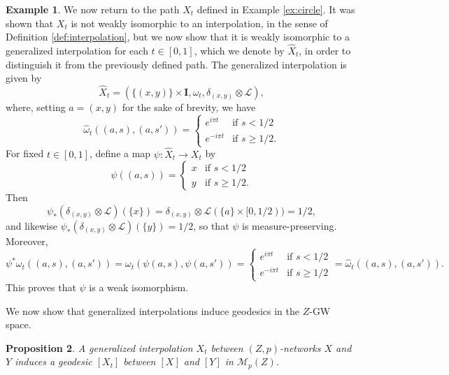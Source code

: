 \documentclass{article}
\newtheorem{proposition}{Proposition}[section]
\theoremstyle{definition}
\newtheorem{example}[proposition]{Example}
\newcommand{\M}{\mathcal{M}}
\newcommand{\MZp}{\M_p(Z)}
\begin{document}
 \begin{example}
        We now return to the path $X_t$ defined in Example \ref{ex:circle}. It was shown that $X_t$ is not weakly isomorphic to an interpolation, in the sense of Definition \ref{def:interpolation}, but we now show that it is weakly isomorphic to a generalized interpolation for each $t \in [0,1]$, which we denote by $\widehat{X}_t$, in order to distinguish it from the previously defined path. The generalized interpolation is given by
        \[
        \widehat{X}_t = \left(\{(x,y)\} \times \mathbf{I}, \widehat{\omega}_t, \delta_{(x,y)} \otimes \mathscr{L}\right),
        \]
        where, setting $a = (x,y)$ for the sake of brevity, we have 
        \[
        \widehat{\omega}_t((a,s),(a,s')) = \left\{\begin{array}{rl}
        e^{i\pi t} &\mbox{if $s < 1/2$} \\
        e^{-i\pi t} &\mbox{if $s \geq 1/2$}.
        \end{array}\right.
        \]
        For fixed $t \in [0,1]$, define a map $\psi:\widehat{X}_t \to X_t$
        by 
        \[
        \psi((a,s)) = \left\{
        \begin{array}{rl}
        x & \mbox{if $s < 1/2$} \\
        y & \mbox{if $s \geq 1/2$.}
        \end{array}\right.
        \]
        Then 
        \[
        \psi_\ast (\delta_{(x,y)} \otimes \mathscr{L})(\{x\}) = \delta_{(x,y)} \otimes \mathscr{L}(\{a\} \times [0,1/2)) = 1/2,
        \]
        and likewise $\psi_\ast (\delta_{(x,y)} \otimes \mathscr{L})(\{y\}) = 1/2$, so that $\psi$ is measure-preserving. Moreover, 
        \[
        \psi^\ast \omega_t((a,s),(a,s')) = \omega_t(\psi(a,s),\psi(a,s')) = \left\{
        \begin{array}{rl}
        e^{i \pi t} & \mbox{if $s < 1/2$} \\
        e^{-i\pi t} & \mbox{if $s \geq 1/2$}
        \end{array}\right. = \widehat{\omega}_t((a,s),(a,s')).
        \]
        This proves that $\psi$ is a weak isomorphism. 
    \end{example}

We now show that generalized interpolations induce geodesics in the $Z$-GW space. 

\begin{proposition}
    A generalized interpolation $X_t$ between $(Z,p)$-networks $X$ and $Y$ induces a geodesic $[X_t]$ between $[X]$ and $[Y]$ in $\MZp$. 
\end{proposition}
\end{document}
